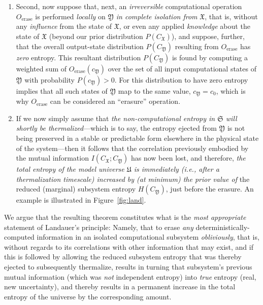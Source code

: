 \documentclass[preprints,article,accept,moreauthors,pdftex]{Definitions/mdpi}
\begin{document}
\begin{paracol}{2}
\begin{enumerate}
    \item Second, now suppose that, next, an \emph{irreversible} computational operation $O_{\mathrm{erase}}$ is performed \emph{locally} on $\mathfrak{Y}$ \emph{in complete isolation from} $\mathfrak{X}$, that is, without any \emph{influence} from the state of $\mathfrak{X}$, or even any applied \emph{knowledge} about the state of $\mathfrak{X}$ (beyond our prior distribution $P(C_\mathfrak{X})$), and suppose, further, that the overall output-state distribution $P(C_\mathfrak{Y})$ resulting from $O_\mathrm{erase}$ has \emph{zero} entropy. This resultant distribution $P(C_\mathfrak{Y})$ is found by computing a weighted sum of $O_\mathrm{erase}(c_\mathfrak{Y})$ over the set of all input computational states of $\mathfrak{Y}$ with probability $P(c_\mathfrak{Y})>0$. For this distribution to have zero entropy implies that all such states of $\mathfrak{Y}$ map to the same value, $c_\mathfrak{Y} = c_0$, which is why $O_{\mathrm{erase}}$ can be considered an ``erasure'' operation. 
    
    \item If we now simply assume that \emph{the non-computational entropy in $\mathfrak{S}$ will shortly be thermalized}---which is to say, the entropy ejected from $\mathfrak{Y}$ is not being preserved in a stable or predictable form elsewhere in the physical state of the system---then it follows that the correlation previously embodied by the mutual information $I(C_\mathfrak{X};C_\mathfrak{Y})$ has now been lost, and therefore, \emph{the total entropy of the model universe $\mathfrak{U}$ is immediately \emph{(\emph{i.e.}, after a thermalization timescale)} increased by (at minimum) the prior value of} the reduced (marginal) subsystem entropy $H(C_\mathfrak{Y})$, just before the erasure. An example is illustrated in Figure~\ref{fig:land}.
\end{enumerate}

We argue that the resulting theorem constitutes what is the \emph{most appropriate} statement of Landauer's principle: Namely, that to erase \emph{any} deterministically-computed information in an isolated computational subsystem \textit{obliviously}, that is, without regards to its correlations with other information that may exist, and if this is followed by allowing the reduced subsystem entropy that was thereby ejected to subsequently thermalize, results in turning that subsystem's previous mutual information (which was \emph{not} independent entropy) into \emph{true} entropy (real, new uncertainty), and thereby results in a permanent increase in the total entropy of the universe by the corresponding amount. 


\end{paracol}
\end{document}

